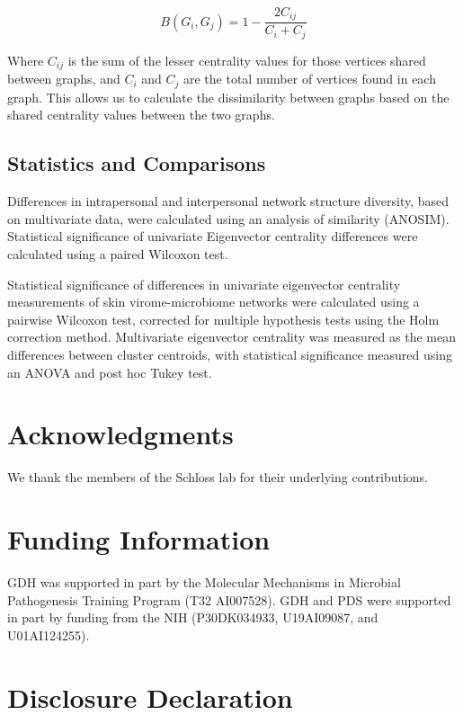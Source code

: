 \documentclass[12pt,]{article}
\begin{document}
\[ B\left( { G }_{ i },{ G }_{ j } \right) =1-\frac { 2{ C }_{ ij } }{ { C }_{ i }+{ C }_{ j } } \]

Where \(C_{ij}\) is the sum of the lesser centrality values for those
vertices shared between graphs, and \(C_{i}\) and \(C_{j}\) are the
total number of vertices found in each graph. This allows us to
calculate the dissimilarity between graphs based on the shared
centrality values between the two graphs.

\subsection{Statistics and
Comparisons}\label{statistics-and-comparisons}

Differences in intrapersonal and interpersonal network structure
diversity, based on multivariate data, were calculated using an analysis
of similarity (ANOSIM). Statistical significance of univariate
Eigenvector centrality differences were calculated using a paired
Wilcoxon test.

Statistical significance of differences in univariate eigenvector
centrality measurements of skin virome-microbiome networks were
calculated using a pairwise Wilcoxon test, corrected for multiple
hypothesis tests using the Holm correction method. Multivariate
eigenvector centrality was measured as the mean differences between
cluster centroids, with statistical significance measured using an ANOVA
and post hoc Tukey test.

\section{Acknowledgments}\label{acknowledgments}

We thank the members of the Schloss lab for their underlying
contributions.

\section{Funding Information}\label{funding-information}

GDH was supported in part by the Molecular Mechanisms in Microbial
Pathogenesis Training Program (T32 AI007528). GDH and PDS were supported
in part by funding from the NIH (P30DK034933, U19AI09087, and
U01AI124255).

\section{Disclosure Declaration}\label{disclosure-declaration}
\end{document}
